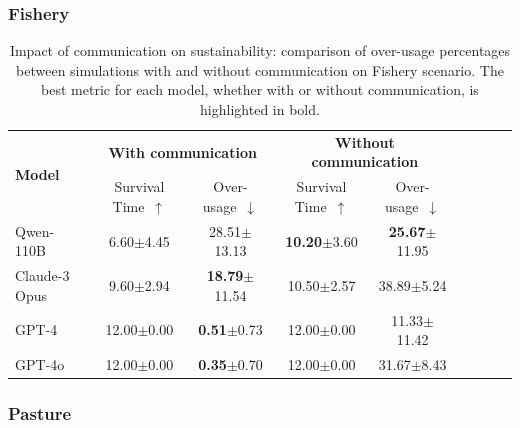 \documentclass{article}
\newcommand{\survivalTimeName}{Survival Time\xspace}
\newcommand{\overusageName}{Over-usage\xspace}
\newcommand{\fishScenarioFull}{Fishery\xspace}
\newcommand{\sheepScenarioFull}{Pasture\xspace}
\begin{document}
\subsubsection{\fishScenarioFull}
\begin{table}[h]
\centering \small
\caption{Impact of communication on sustainability: comparison of over-usage percentages
between simulations with and without communication on \fishScenarioFull scenario. The best metric for each model, whether with or without communication, is highlighted in bold.}
\label{tab:ablation_perturbation_fish}
\begin{tabular}{lcccccccc}
\toprule
\multirow{2}{*}{\textbf{Model}} & \multicolumn{2}{c}{\textbf{With communication}} & \multicolumn{2}{c}{\textbf{Without communication}} \\
& \survivalTimeName~$\uparrow$  & \overusageName~$\downarrow$ 
& \survivalTimeName~$\uparrow$  & \overusageName~$\downarrow$\\ 
\midrule

Qwen-110B & {6.60}\tiny{$\pm$4.45} & {{28.51}}\tiny{$\pm$13.13} & \textbf{10.20}\tiny{$\pm$3.60} & \textbf{25.67}\tiny{$\pm$11.95} \\
Claude-3 Opus & 9.60\tiny{$\pm$2.94} & \textbf{18.79}\tiny{$\pm$11.54} & 10.50\tiny{$\pm$2.57} & {38.89}\tiny{$\pm$5.24} \\
GPT-4 & {12.00}\tiny{$\pm$0.00} & \textbf{0.51}\tiny{$\pm$0.73} & {12.00}\tiny{$\pm$0.00} & 11.33\tiny{$\pm$11.42} \\
GPT-4o & {12.00}\tiny{$\pm$0.00} &\textbf{0.35}\tiny{$\pm$0.70} & {12.00}\tiny{$\pm$0.00} & 31.67\tiny{$\pm$8.43} \\


\bottomrule
\end{tabular}
\end{table}


\subsubsection{\sheepScenarioFull}
\end{document}
